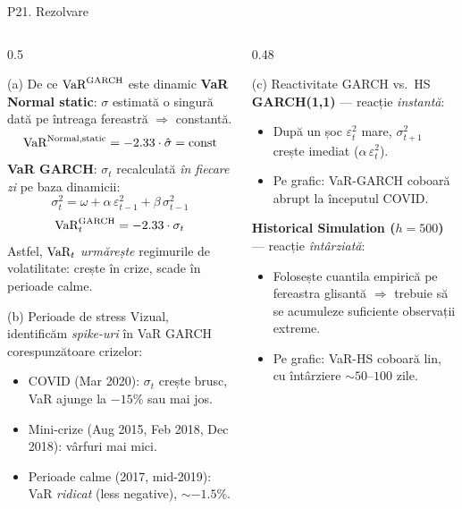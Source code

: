 \documentclass[9pt, aspectratio=169, t]{beamer}
\begin{document}
\begin{frame}[shrink=30]{P21. Rezolvare}
\begin{columns}[T]
\begin{column}{0.5\textwidth}
\begin{block}{(a) De ce $\text{VaR}^{\text{GARCH}}$ este dinamic}
\textbf{VaR Normal static}: $\sigma$ estimată o singură dată pe întreaga fereastră $\Rightarrow$ constantă.
\[
\text{VaR}^{\text{Normal,static}} = -2.33\cdot \hat\sigma = \text{const}
\]
\textbf{VaR GARCH}: $\sigma_t$ recalculată \emph{în fiecare zi} pe baza dinamicii:
\[
\sigma_t^2 = \omega + \alpha\,\varepsilon_{t-1}^2 + \beta\,\sigma_{t-1}^2
\]
\[
\text{VaR}_t^{\text{GARCH}} = -2.33\cdot \sigma_t
\]
Astfel, $\text{VaR}_t$ \emph{urmărește} regimurile de volatilitate: crește în crize, scade în perioade calme.
\end{block}
\begin{block}{(b) Perioade de stress}
Vizual, identificăm \emph{spike-uri} în VaR GARCH corespunzătoare crizelor:
\begin{itemize}\setlength{\itemsep}{0pt}
\item COVID (Mar 2020): $\sigma_t$ crește brusc, VaR ajunge la $-15\%$ sau mai jos.
\item Mini-crize (Aug 2015, Feb 2018, Dec 2018): vârfuri mai mici.
\item Perioade calme (2017, mid-2019): VaR \emph{ridicat} (less negative), $\sim -1.5\%$.
\end{itemize}
\end{block}
\end{column}
\begin{column}{0.48\textwidth}
\begin{block}{(c) Reactivitate GARCH vs.\ HS}
\textbf{GARCH(1,1)} --- reacție \emph{instantă}:
\begin{itemize}\setlength{\itemsep}{0pt}
\item După un șoc $\varepsilon_t^2$ mare, $\sigma_{t+1}^2$ crește imediat ($\alpha\,\varepsilon_t^2$).
\item Pe grafic: VaR-GARCH coboară abrupt la începutul COVID.
\end{itemize}
\textbf{Historical Simulation ($h=500$)} --- reacție \emph{întârziată}:
\begin{itemize}\setlength{\itemsep}{0pt}
\item Folosește cuantila empirică pe fereastra glisantă $\Rightarrow$ trebuie să se acumuleze suficiente observații extreme.
\item Pe grafic: VaR-HS coboară lin, cu întârziere $\sim 50$--$100$ zile.

\end{itemize}
\end{block}
\end{column}
\end{columns}
\end{frame}
\end{document}

